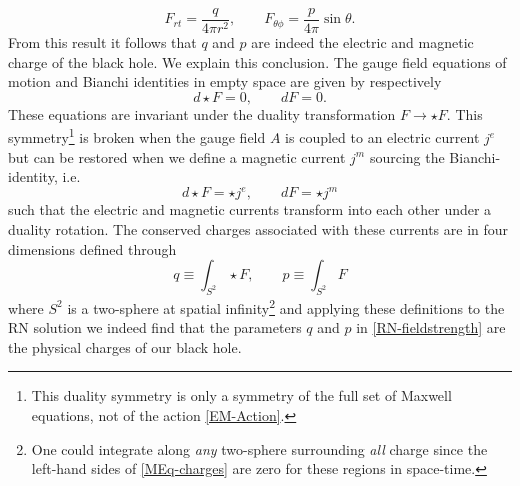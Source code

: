 \documentclass[12pt,twoside]{book}
\begin{document}
\begin{equation}\label{RN-fieldstrength}
F_{rt} = \frac{q}{4\pi r^{2}}, \qquad F_{\theta\phi} = \frac{p}{4 \pi}\sin\theta.
\end{equation}
From this result it follows that $q$ and $p$ are indeed the electric and magnetic charge of the black hole. We explain this conclusion. The gauge field equations of motion and Bianchi identities in empty space are given by respectively
\begin{equation}
d\star F = 0, \qquad dF = 0.
\end{equation}
These equations are invariant under the duality transformation $F \rightarrow \star F$. This symmetry\footnote{This duality symmetry is only a symmetry of the full set of Maxwell equations, not of the action \eqref{EM-Action}.} is broken when the gauge field $A$ is coupled to an electric current $j^{e}$ but can be restored when we define a magnetic current $j^{m}$ sourcing the Bianchi-identity, i.e.\
\begin{equation}\label{MEq-charges}
d\star F = \star j^{e}, \qquad dF = \star j^{m}
\end{equation}
such that the electric and magnetic currents transform into each other under a duality rotation.
The conserved charges associated with these currents are in four dimensions defined through
\begin{equation}
q \equiv \int_{S^{2}}\star F, \qquad p \equiv \int_{S^{2}}F
\end{equation}where $S^{2}$ is a two-sphere at spatial infinity\footnote{One could integrate along \emph{any} two-sphere surrounding \emph{all} charge since the left-hand sides of \eqref{MEq-charges} are zero for these regions in space-time.} and applying these definitions to the RN solution we indeed find that the parameters $q$ and $p$ in \eqref{RN-fieldstrength} are the physical charges of our black hole.
\end{document}
